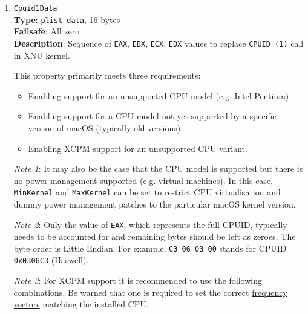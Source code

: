 \documentclass[]{article}
\providecommand{\tightlist}{%
  \setlength{\itemsep}{0pt}\setlength{\parskip}{0pt}}
\begin{document}
\begin{enumerate}

\item
  \texttt{Cpuid1Data}\\
  \textbf{Type}: \texttt{plist\ data}, 16 bytes\\
  \textbf{Failsafe}: All zero\\
  \textbf{Description}: Sequence of \texttt{EAX}, \texttt{EBX}, \texttt{ECX},
  \texttt{EDX} values to replace \texttt{CPUID (1)} call in XNU kernel.

  This property primarily meets three requirements:

  \begin{itemize}
    \tightlist
    \item Enabling support for an unsupported CPU model (e.g. Intel Pentium).
    \item Enabling support for a CPU model not yet supported by a specific version of macOS (typically old versions).
    \item Enabling XCPM support for an unsupported CPU variant.
  \end{itemize}

  \emph{Note 1}: It may also be the case that the CPU model is supported but there is no power management supported
  (e.g. virtual machines). In this case, \texttt{MinKernel} and \texttt{MaxKernel} can be set to restrict CPU virtualisation and dummy power
  management patches to the particular macOS kernel version.

  \emph{Note 2}: Only the value of \texttt{EAX}, which represents the full CPUID,
  typically needs to be accounted for and remaining bytes should be left as zeroes.
  The byte order is Little Endian. For example, \texttt{C3 06 03 00} stands for CPUID
  \texttt{0x0306C3} (Haswell).

  \emph{Note 3}: For XCPM support it is recommended to use the following combinations.
  Be warned that one is required to set the correct
  \href{https://github.com/dortania/bugtracker/issues/190}{frequency vectors} matching
  the installed CPU.


\end{enumerate}
\end{document}
